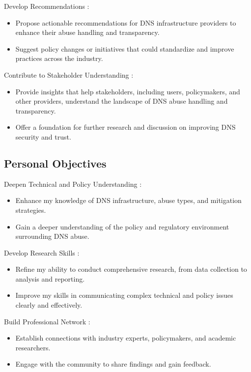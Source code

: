 Develop Recommendations :

\begin{itemize}
  \item Propose actionable recommendations for DNS infrastructure providers to enhance their abuse handling and transparency.
  \item Suggest policy changes or initiatives that could standardize and improve practices across the industry.
\end{itemize}

Contribute to Stakeholder Understanding : 

\begin{itemize}
  \item Provide insights that help stakeholders, including users, policymakers, and other providers, understand the landscape of DNS abuse handling and transparency.
  \item Offer a foundation for further research and discussion on improving DNS security and trust.
\end{itemize}

\subsection {Personal Objectives}

Deepen Technical and Policy Understanding :

\begin{itemize}
  \item Enhance my knowledge of DNS infrastructure, abuse types, and mitigation strategies.
  \item Gain a deeper understanding of the policy and regulatory environment surrounding DNS abuse.
\end{itemize}

Develop Research Skills :

\begin{itemize}
  \item Refine my ability to conduct comprehensive research, from data collection to analysis and reporting.
  \item Improve my skills in communicating complex technical and policy issues clearly and effectively.
\end{itemize}

Build Professional Network : 

\begin{itemize}
  \item Establish connections with industry experts, policymakers, and academic researchers.
  \item Engage with the community to share findings and gain feedback.
\end{itemize}

